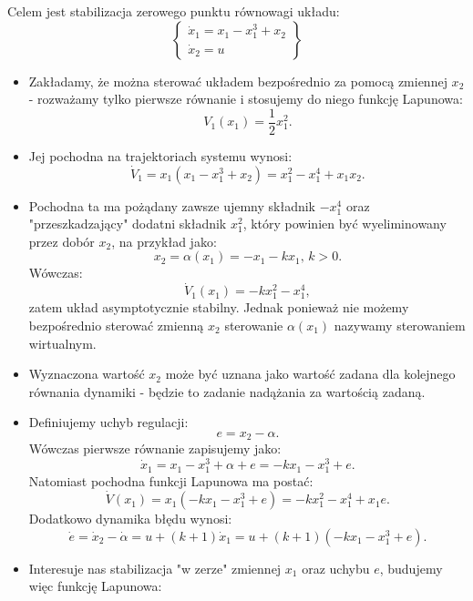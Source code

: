 \documentclass{article}
\begin{document}
    \begin{tcolorbox}[colback=green!5, colframe=green!75!black, title=Przykład]
    Celem jest stabilizacja zerowego punktu równowagi układu:
    $$
        \left\{
        \begin{array}{l}
             \dot{x}_{1} = x_{1} - x_{1}^{3} + x_{2}\\
             \dot{x}_{2} = u
        \end{array}
        \right\}
    $$
    \begin{itemize}
        \item Zakładamy, że można sterować układem bezpośrednio za pomocą zmiennej $x_{2}$ - rozważamy tylko pierwsze równanie i stosujemy do niego funkcję Lapunowa:
        $$
            V_{1}(x_{1}) = \frac{1}{2}x_{1}^{2}.
        $$
        \item Jej pochodna na trajektoriach systemu wynosi:
        $$
            \dot{V}_{1} = x_{1}(x_{1} - x_{1}^{3} + x_{2}) = x_{1}^{2} - x_{1}^{4} + x_{1}x_{2}.
        $$
        \item Pochodna ta ma pożądany zawsze ujemny składnik $-x_{1}^{4}$ oraz "przeszkadzający" dodatni składnik $x_{1}^{2}$, który powinien być wyeliminowany przez dobór $x_{2}$, na przykład jako:
        $$
            x_{2} =\alpha(x_{1}) = -x_{1} - kx_{1}, \, k>0.
        $$
        Wówczas:
        $$
            \dot{V}_{1}(x_{1}) = -k{x}_{1}^{2} - x_{1}^{4},
        $$
        zatem układ asymptotycznie stabilny.
        Jednak ponieważ nie możemy bezpośrednio sterować zmienną $x_{2}$ sterowanie $\alpha(x_{1})$ nazywamy sterowaniem wirtualnym.
        \item Wyznaczona wartość $x_{2}$ może być uznana jako wartość zadana dla kolejnego równania dynamiki - będzie to zadanie nadążania za wartością zadaną.
        \item Definiujemy uchyb regulacji:
        $$
            e = x_{2} - \alpha.
        $$
        Wówczas pierwsze równanie zapisujemy jako:
        $$
            \dot{x}_{1} = x_{1} - x_{1}^{3} + \alpha + e = -kx_{1} - x_{1}^{3} + e.
        $$
        Natomiast pochodna funkcji Lapunowa ma postać:
        $$
            \dot{V}(x_{1}) = x_{1}(-kx_{1} - x_{1}^{3} + e) = -kx_{1}^2 - x_{1}^{4} + x_{1}e.
        $$
        Dodatkowo dynamika błędu wynosi:
        $$
            \dot{e} = \dot{x}_{2} - \dot{\alpha} = u + (k+1)\dot{x}_{1} = u + (k+1)(-kx_{1} - x_{1}^{3} + e).
        $$
        \item Interesuje nas stabilizacja "w zerze" zmiennej $x_{1}$ oraz uchybu $e$, budujemy więc funkcję Lapunowa:

\end{itemize}
\end{tcolorbox}
\end{document}
